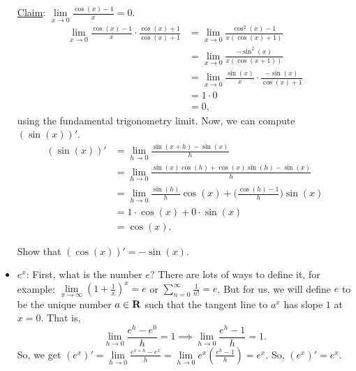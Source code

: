 \begin{itemize}
          \underline{Claim}: $ \displaystyle \lim\limits_{{x} \to {0}}\frac{\cos(x)-1}{x}=0 $.
          \begin{align*}
              \lim\limits_{{x} \to {0}} \frac{\cos(x)-1}{x}\cdot \frac{\cos(x)+1}{\cos(x)+1}
               & =\lim\limits_{{x} \to {0}}\frac{\cos^2(x)-1}{x(\cos(x)+1)}                  \\
               & =\lim\limits_{{x} \to {0}}\frac{-\sin^2(x)}{x(\cos(x+1))}                   \\
               & =\lim\limits_{{x} \to {0}}\frac{\sin(x)}{x}\cdot \frac{-\sin(x)}{\cos(x)+1} \\
               & =1\cdot 0                                                                   \\
               & =0,
          \end{align*}
          using the fundamental trigonometry limit. Now, we can compute $ (\sin(x))' $.
          \begin{align*}
              (\sin(x))'
               & =\lim\limits_{{h} \to {0}}\frac{\sin(x+h)-\sin(x)}{h}                                       \\
               & =\lim\limits_{{h} \to {0}}\frac{\sin(x)\cos(h)+\cos(x)\sin(h)-\sin(x)}{h}                   \\
               & =\lim\limits_{{h} \to {0}}\frac{\sin(h)}{h}\cos(x)+\biggl(\frac{\cos(h)-1}{h}\biggr)\sin(x) \\
               & =1\cdot \cos(x)+0\cdot \sin(x)                                                              \\
               & =\cos(x).
          \end{align*}
          \begin{Exercise}{}{}
              Show that $ (\cos(x))'=-\sin(x) $.
          \end{Exercise}
    \item $ e^x $: First, what is the number $ e $? There are lots of ways to define it, for example:
          $ \lim\limits_{{x} \to {\infty}}(1+\frac{1}{x})^{x}=e $ or $ \sum_{n=0}^{\infty}\frac{1}{n!}=e $.
          But for us, we will define $ e $ to be the unique number $ a\in\mathbf{R} $ such that the tangent line to $ a^x $
          has slope $ 1 $ at $ x=0 $. That is,
          \[ \lim\limits_{{h} \to {0}}\frac{e^h-e^0}{h}=1\implies \lim\limits_{{h} \to {0}}\frac{e^h-1}{h}=1. \]
          So, we get $ (e^x)'=\lim\limits_{{h} \to {0}}\frac{e^{x+h}-e^x}{h}=\lim\limits_{{h} \to {0}}e^x(\frac{e^h-1}{h})=e^x $.
          So, $ (e^x)'=e^x $.
\end{itemize}
